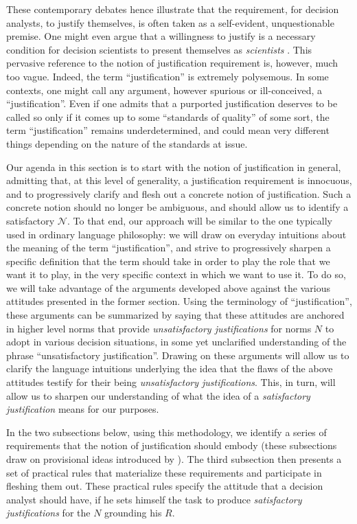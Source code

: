 \documentclass[preprint, french, english, 11pt, authoryear]{elsarticle}%
\newcommand{\adv}{\mathscr{N}}
\begin{document}
These contemporary debates hence illustrate that the requirement, for decision analysts, to justify themselves, is often taken as a self-evident, unquestionable premise. One might even argue that a willingness to justify is a necessary condition for decision scientists to present themselves as \emph{scientists} \citep{ormerod_justifying_2010}. This pervasive reference to the notion of justification requirement is, however, much too vague. Indeed, the term ``justification'' is extremely polysemous. In some contexts, one might call any argument, however spurious or ill-conceived, a ``justification''. Even if one admits that a purported justification deserves to be called so only if it comes up to some ``standards of quality'' of some sort, the term ``justification'' remains underdetermined, and could mean very different things depending on the nature of the standards at issue.

Our agenda in this section is to start with the notion of justification in general, admitting that, at this level of generality, a justification requirement is innocuous, and to progressively clarify and flesh out a concrete notion of justification. Such a concrete notion should no longer be ambiguous, and should allow us to identify a satisfactory $\adv$. To that end, our approach will be similar to the one typically used in ordinary language philosophy: we will draw on everyday intuitions about the meaning of the term ``justification'', and strive to progressively sharpen a specific definition that the term should take in order to play the role that we want it to play, in the very specific context in which we want to use it. To do so, we will take advantage of the arguments developed above against the various attitudes presented in the former section. Using the terminology of ``justification'', these arguments can be summarized by saying that these attitudes are anchored in higher level norms that provide \emph{unsatisfactory justifications} for norms $N$ to adopt in various decision situations, in some yet unclarified understanding of the phrase ``unsatisfactory justification''. Drawing on these arguments will allow us to clarify the language intuitions underlying the idea that the flaws of the above attitudes testify for their being \emph{unsatisfactory justifications}. This, in turn, will allow us to sharpen our understanding of what the idea of a \emph{satisfactory justification} means for our purposes.

In the two subsections below, using this methodology, we identify a series of requirements that the notion of justification should embody (these subsections draw on provisional ideas introduced by \citet{meinard_du_2013, meinard_what_2017}). The third subsection then presents a set of practical rules that materialize these requirements and participate in fleshing them out. These practical rules specify the attitude that a decision analyst should have, if he sets himself the task to produce \emph{satisfactory justifications} for the $N$ grounding his $R$.
\end{document}
